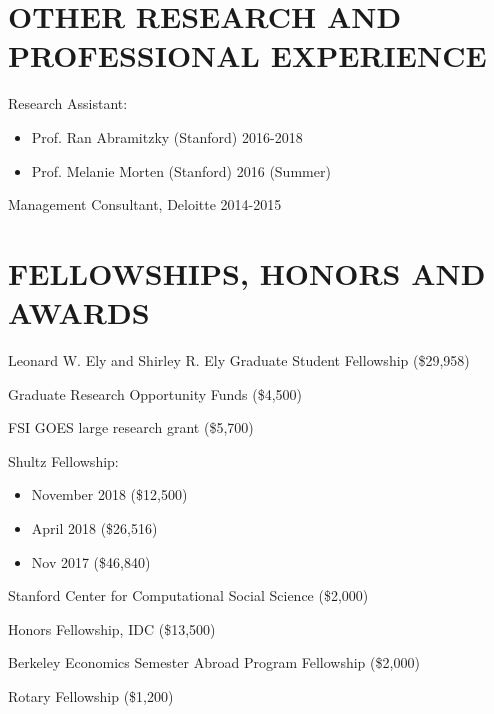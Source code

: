 \documentclass[margin]{res} %
\begin{document}
\begin{resume}
 
\section{OTHER RESEARCH AND PROFESSIONAL EXPERIENCE}
 Research Assistant:
\begin{itemize}
	\item Prof. Ran Abramitzky (Stanford) \hfill 2016-2018
	\item Prof. Melanie Morten (Stanford) \hfill 2016 (Summer)
\end{itemize}
 
 Management Consultant, Deloitte \hfill 2014-2015 


\section{FELLOWSHIPS, HONORS AND AWARDS}

		 Leonard W. Ely and Shirley R. Ely Graduate Student Fellowship (\$29,958)

     Graduate Research Opportunity Funds (\$4,500)

     FSI GOES large research grant (\$5,700)

     Shultz Fellowship:
     \begin{itemize}
     	\item November 2018 (\$12,500)
     	\item April 2018 (\$26,516)
     	\item Nov 2017 (\$46,840)
     \end{itemize}

		 Stanford Center for Computational Social Science (\$2,000) 

		 Honors Fellowship, IDC (\$13,500) 

		 Berkeley Economics Semester Abroad Program Fellowship (\$2,000) 

		 Rotary Fellowship (\$1,200) 


 

\end{resume}
\end{document}
